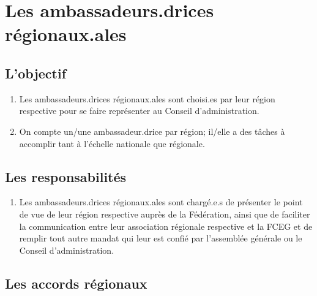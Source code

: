 \section{Les ambassadeurs.drices régionaux.ales}
\label{les-ambassadeurs-drices-regionaux-ales}

\subsection{L'objectif}
\label{lobjectif}

\begin{enumerate}
 \item
  Les ambassadeurs.drices régionaux.ales sont choisi.es par leur région respective pour se faire représenter au Conseil d'administration.
 \item
  On compte un/une ambassadeur.drice par région; il/elle a des tâches à accomplir tant à l'échelle nationale que régionale.
\end{enumerate}

\subsection{Les responsabilités}
\label{les-responsabilites}

\begin{enumerate}
 \item
  Les ambassadeurs.drices régionaux.ales sont chargé.e.s de présenter le point de vue de leur région respective auprès de la Fédération, ainsi que de faciliter la communication entre leur association régionale respective et la FCEG et de remplir tout autre mandat qui leur est confié par l'assemblée générale ou le Conseil d'administration.
\end{enumerate}

\subsection{Les accords régionaux}
\label{les-accords-regionaux}

